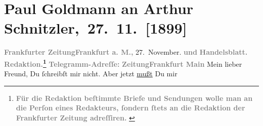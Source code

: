 

         
         \renewcommand{\erwaehntePersonen}{Personen: Theodore Rottenberg, Gertrud Rottenberg, Ludwig Rottenberg}
         \renewcommand{\erwaehnteInstitutionen}{Institutionen: Frankfurter Zeitung}
         \renewcommand{\erwaehnteOrte}{Orte: Frankfurt am Main, Wien}
         \renewcommand{\erwaehnteWerke}{}
               \section[ Paul Goldmann an Arthur Schnitzler, 27. 11. {[}1899{]}]{ Paul Goldmann an Arthur Schnitzler, 27. 11. {[}1899{]}}\nopagebreak{}\rehead{ }\begin{ledgroupsized}[t]{13cm}\normalsize\beginnumbering \toendnotes[C]{\smallbreak\pagebreak[2]} 
\toendnotes[C]{\smallbreak}\pstart
           \noindent{}{\pb}\textcolor{gray}{\textbf{\textbf{Frankfurter Zeitung}}}\hfill \textcolor{gray}{\textbf{\textbf{Frankfurt a.
                        M.,}}}{ }27. November.\pend
           \pstart
           \textcolor{gray}{\textbf{und}}\pend
           \pstart
           \textcolor{gray}{\textbf{Handelsblatt.}}\pend
           \pstart
           \textcolor{gray}{\textbf{\textbf{Redaktion.}\footnote{\noindent{}\textcolor{gray}{\textbf{Für die Redaktion beſtimmte Briefe und Sendungen wolle man
                                  an die Perſon eines Redakteurs,
                              ſondern ſtets \textbf{an die Redaktion der Frankfurter Zeitung} adreſſiren. }}}}}\pend
           \pstart
           \textcolor{gray}{\textbf{Telegramm-Adreſſe: }}\pend
           \pstart
           \textcolor{gray}{\textbf{\textbf{ZeitungFrankfurt Main}}}\pend
           \pstart{}Mein lieber Freund,\pend\pstart
           Du ſchreibſt mir nicht. Aber jetzt \uline{mußt} Du mir

\end{ledgroupsized}
